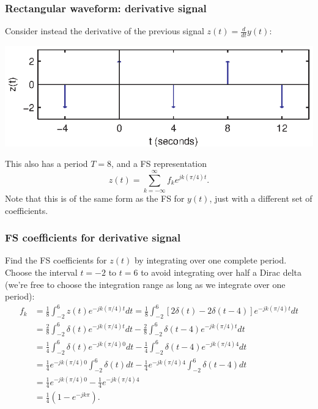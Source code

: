 \documentclass[10pt]{beamer}
\begin{document}
\begin{frame}
\frametitle{Rectangular waveform: derivative signal}

Consider instead the derivative of the previous signal $z(t) = \frac{d}{dt} y(t)$:
\begin{center}
  \includegraphics{fs_add_fig03}
\end{center}
This also has a period $T=8$, and a FS representation 
\begin{equation*}
  z(t) = \sum_{k=-\infty}^\infty f_k e^{j k (\pi/4) t}.
\end{equation*}
Note that this is of the same form as the FS for $y(t)$, just
with a different set of coefficients.
\end{frame}

\begin{frame}
\frametitle{FS coefficients for derivative signal}

Find the FS coefficients for $z(t)$ by integrating over one 
complete period.  Choose the interval $t=-2$ to $t=6$ to avoid
integrating over half a Dirac delta (we're free to choose the 
integration range as long as we integrate over one period):
\begin{align*}
  f_k &= \frac{1}{8} \int_{-2}^6 z(t) e^{-j k (\pi/4) t} dt
  = \frac{1}{8} \int_{-2}^6 [2 \delta(t) 
  - 2 \delta(t-4)] e^{-j k (\pi/4) t} dt \\
  &= \frac{2}{8} \int_{-2}^6 \delta(t) e^{-j k (\pi/4) t} dt 
  - \frac{2}{8} \int_{-2}^6 \delta(t-4) e^{-j k (\pi/4) t} dt \\
  &= \frac{1}{4} \int_{-2}^6 \delta(t) e^{-j k (\pi/4) 0} dt 
  - \frac{1}{4} \int_{-2}^6 \delta(t-4) e^{-j k (\pi/4) 4} dt \\
  &= \frac{1}{4} e^{-j k (\pi/4) 0} \int_{-2}^6 \delta(t) dt 
  - \frac{1}{4} e^{-j k (\pi/4) 4} \int_{-2}^6 \delta(t-4)  dt \\
  &= \frac{1}{4} e^{-j k (\pi/4) 0} - \frac{1}{4} e^{-j k (\pi/4) 4} \\
  &= \frac{1}{4} (1 - e^{-j k \pi}).
\end{align*}
\end{frame}
\end{document}
